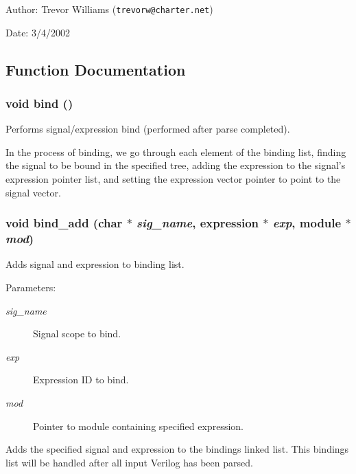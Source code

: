 \begin{Desc}
\item[Author:]Trevor Williams ({\tt trevorw@charter.net}) \end{Desc}
\begin{Desc}
\item[Date:]3/4/2002 \end{Desc}


\subsection{Function Documentation}
\subsubsection{\setlength{\rightskip}{0pt plus 5cm}void bind ()}\label{binding_8h_a3}


Performs signal/expression bind (performed after parse completed). 

In the process of binding, we go through each element of the binding list, finding the signal to be bound in the specified tree, adding the expression to the signal's expression pointer list, and setting the expression vector pointer to point to the signal vector. 
\subsubsection{\setlength{\rightskip}{0pt plus 5cm}void bind\_\-add (char $\ast$ {\em sig\_\-name}, {\bf expression} $\ast$ {\em exp}, {\bf module} $\ast$ {\em mod})}\label{binding_8h_a0}


Adds signal and expression to binding list. 

\begin{Desc}
\item[Parameters:]
\begin{description}
\item[{\em sig\_\-name}]Signal scope to bind. \item[{\em exp}]Expression ID to bind. \item[{\em mod}]Pointer to module containing specified expression.\end{description}
\end{Desc}
Adds the specified signal and expression to the bindings linked list. This bindings list will be handled after all input Verilog has been parsed. 
